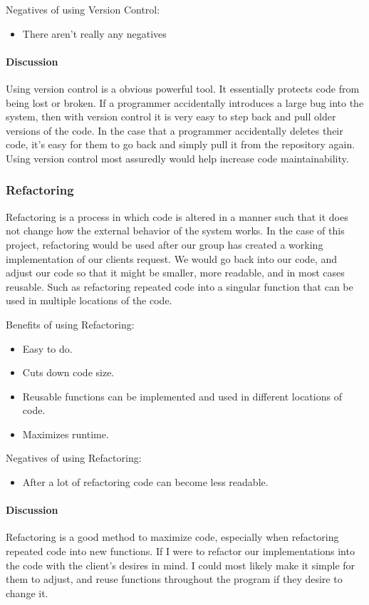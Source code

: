 \documentclass[10pt,journal,compsoc,draftclsnofoot]{IEEEtran}
\begin{document}
Negatives of using Version Control:
\begin{itemize}
\item There aren't really any negatives
\end{itemize}

\paragraph{Discussion}
\vspace{3mm}
Using version control is a obvious powerful tool.
It essentially protects code from being lost or broken.
If a programmer accidentally introduces a large bug into the system, then with version control it is very easy to step back and pull older versions of the code.
In the case that a programmer accidentally deletes their code, it's easy for them to go back and simply pull it from the repository again.
Using version control most assuredly would help increase code maintainability.

\subsubsection{Refactoring}
Refactoring is a process in which code is altered in a manner such that it does not change how the external behavior of the system works.\cite{refactoring}
In the case of this project, refactoring would be used after our group has created a working implementation of our clients request.
We would go back into our code, and adjust our code so that it might be smaller, more readable, and in most cases reusable.
Such as refactoring repeated code into a singular function that can be used in multiple locations of the code.

Benefits of using Refactoring:
\begin{itemize}
\item Easy to do.
\item Cuts down code size.
\item Reusable functions can be implemented and used in different locations of code.
\item Maximizes runtime.
\end{itemize}

Negatives of using Refactoring:
\begin{itemize}
\item After a lot of refactoring code can become less readable.
\end{itemize}

\paragraph{Discussion}
Refactoring is a good method to maximize code, especially when refactoring repeated code into new functions.
If I were to refactor our implementations into the code with the client's desires in mind.
I could most likely make it simple for them to adjust, and reuse functions throughout the program if they desire to change it.
\end{document}
